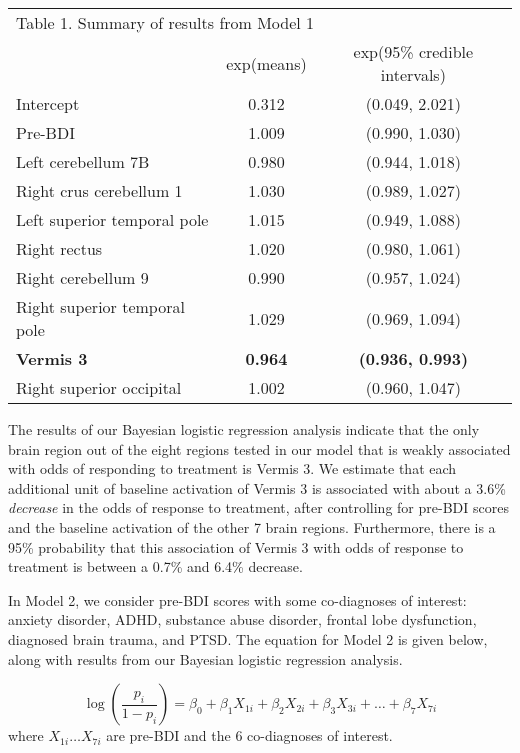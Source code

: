 \documentclass[12pt,doc]{apa}
\begin{document}
\begin{tabular}{l c c}
\multicolumn{3}{l}{Table 1. Summary of results from Model 1} \\

& exp(means) & exp(95\% credible intervals) \\
\hline
Intercept & 0.312 & (0.049, 2.021) \\
Pre-BDI & 1.009 & (0.990, 1.030) \\
Left cerebellum 7B & 0.980 & (0.944, 1.018) \\
Right crus cerebellum 1 & 1.030 & (0.989, 1.027) \\
Left superior temporal pole & 1.015 & (0.949, 1.088) \\
Right rectus & 1.020 & (0.980, 1.061) \\
Right cerebellum 9 & 0.990 & (0.957, 1.024) \\
Right superior temporal pole & 1.029 & (0.969, 1.094) \\
\textbf{Vermis 3} & \textbf{0.964} & \textbf{(0.936, 0.993)} \\
Right superior occipital & 1.002 & (0.960, 1.047) \\

\end{tabular}

The results of our Bayesian logistic regression analysis indicate that the only brain region out of the eight regions tested in our model that is weakly associated with odds of responding to treatment is Vermis 3. We estimate that each additional unit of baseline activation of Vermis 3 is associated with about a 3.6\% \emph{decrease} in the odds of response to treatment, after controlling for pre-BDI scores and the baseline activation of the other 7 brain regions. Furthermore, there is a 95\% probability that this association of Vermis 3 with odds of response to treatment is between a 0.7\% and 6.4\% decrease.

In Model 2, we consider pre-BDI scores with some co-diagnoses of interest: anxiety disorder, ADHD, substance abuse disorder, frontal lobe dysfunction, diagnosed brain trauma, and PTSD. The equation for Model 2 is given below, along with results from our Bayesian logistic regression analysis.

\begin{equation}
\log \left( \frac{p_{i}}{1-p_{i}} \right) = \beta_{0} + \beta_{1}X_{1i} + \beta_{2}X_{2i} + \beta_{3}X_{3i} + \ldots + \beta_{7}X_{7i}
\end{equation}
where $X_{1i} \ldots X_{7i}$ are pre-BDI and the 6 co-diagnoses of interest.
\medskip
\end{document}
